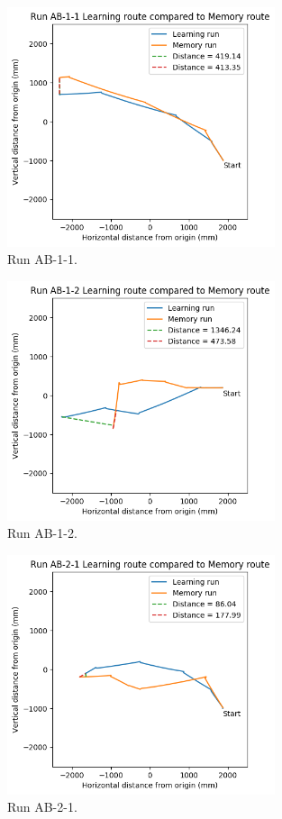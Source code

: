 \documentclass[a4paper,11pt,twoside,openright]{article}
\begin{document}
\begin{figure}[h!]
 \centering
  \includegraphics[width=0.7\textwidth]{AB-1-1}
  \caption{
    \label{fig:ab-1-1} Run AB-1-1.
  }
\end{figure}

\begin{figure}[h!]
 \centering
  \includegraphics[width=0.7\textwidth]{AB-1-2}
  \caption{
    \label{fig:ab-1-2} Run AB-1-2.
  }
\end{figure}

\begin{figure}[h!]
 \centering
  \includegraphics[width=0.7\textwidth]{AB-2-1}
  \caption{
    \label{fig:ab-2-1} Run AB-2-1.
  }
\end{figure}
\end{document}
